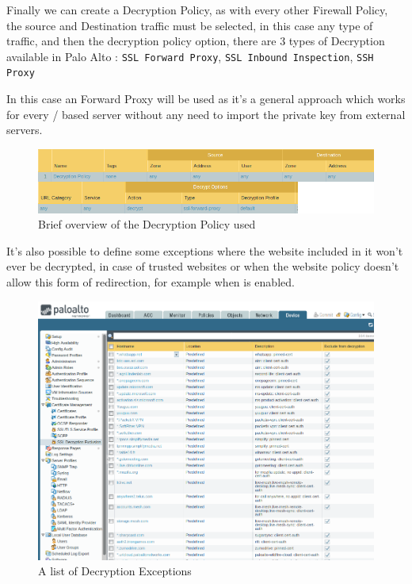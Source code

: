 \newpage

Finally we can create a Decryption Policy, as with every other Firewall Policy, the source and Destination traffic must be selected, in this case any type of traffic, and then the decryption policy option, there are 3 types of Decryption available in Palo Alto : \verb|SSL Forward Proxy|, \verb|SSL Inbound Inspection|, \verb|SSH Proxy|

In this case an  Forward Proxy will be used as it's a general approach which works for every / based server without any need to import the private key from external servers.

\begin{figure}[!hb]
\centering
 \includegraphics[width=13cm]{img/decryption_policy.png}
	\caption{Brief overview of the Decryption Policy used}\label{Decryption Policy}
\end{figure}

It's also possible to define some exceptions where the website included in it won't ever be decrypted, in case of trusted websites or when the website policy doesn't allow this form of redirection, for example when \cite{hsts} is enabled.

\begin{figure}[!h]
\centering
 \includegraphics[width=12cm]{img/decryption_exceptions.png}
	\caption{A list of Decryption Exceptions}\label{Decryption Exceptions}
\end{figure}



